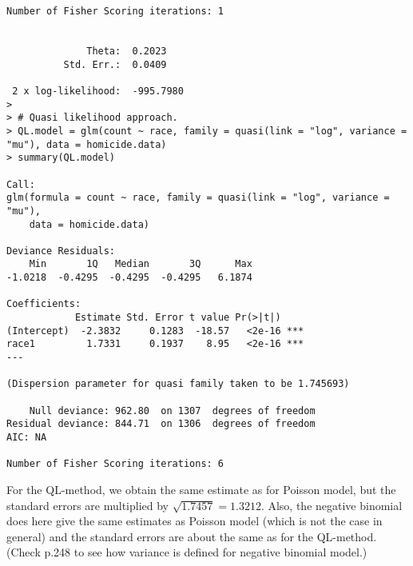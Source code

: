 \begin{lstlisting}
Number of Fisher Scoring iterations: 1


              Theta:  0.2023 
          Std. Err.:  0.0409 

 2 x log-likelihood:  -995.7980 
> 
> # Quasi likelihood approach.
> QL.model = glm(count ~ race, family = quasi(link = "log", variance = "mu"), data = homicide.data)
> summary(QL.model)

Call:
glm(formula = count ~ race, family = quasi(link = "log", variance = "mu"), 
    data = homicide.data)

Deviance Residuals: 
    Min       1Q   Median       3Q      Max  
-1.0218  -0.4295  -0.4295  -0.4295   6.1874  

Coefficients:
            Estimate Std. Error t value Pr(>|t|)    
(Intercept)  -2.3832     0.1283  -18.57   <2e-16 ***
race1         1.7331     0.1937    8.95   <2e-16 ***
---

(Dispersion parameter for quasi family taken to be 1.745693)

    Null deviance: 962.80  on 1307  degrees of freedom
Residual deviance: 844.71  on 1306  degrees of freedom
AIC: NA

Number of Fisher Scoring iterations: 6
\end{lstlisting}
For the QL-method, we obtain the same estimate as for Poisson model, but the standard errors are multiplied by $\sqrt{1.7457} = 1.3212$. Also, the negative binomial does here give the same estimates as Poisson model (which is not the case in general) and the standard errors are about the same as for the QL-method. (Check p.248 to see how variance is defined for negative binomial model.)
